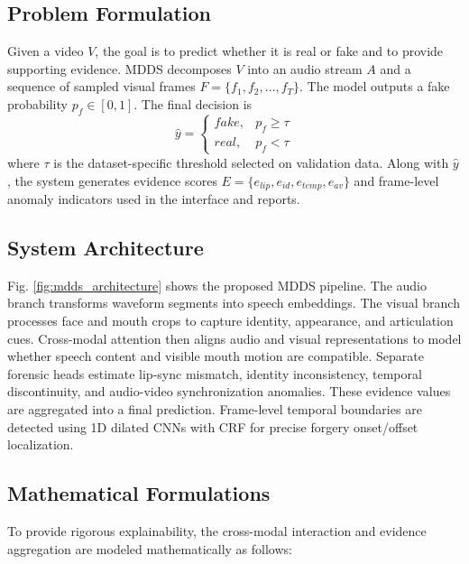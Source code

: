 \documentclass[conference]{IEEEtran}
\begin{document}
\subsection{Problem Formulation}
Given a video $V$, the goal is to predict whether it is real or fake and to provide supporting evidence. MDDS decomposes $V$ into an audio stream $A$ and a sequence of sampled visual frames $F=\{f_1,f_2,\ldots,f_T\}$. The model outputs a fake probability $p_f \in [0,1]$. The final decision is
\begin{equation}
\hat{y} =
\begin{cases}
fake, & p_f \geq \tau \\
real, & p_f < \tau
\end{cases}
\end{equation}
where $\tau$ is the dataset-specific threshold selected on validation data. Along with $\hat{y}$, the system generates evidence scores $E=\{e_{lip},e_{id},e_{temp},e_{av}\}$ and frame-level anomaly indicators used in the interface and reports.

\subsection{System Architecture}
Fig. \ref{fig:mdds_architecture} shows the proposed MDDS pipeline. The audio branch transforms waveform segments into speech embeddings. The visual branch processes face and mouth crops to capture identity, appearance, and articulation cues. Cross-modal attention then aligns audio and visual representations to model whether speech content and visible mouth motion are compatible. Separate forensic heads estimate lip-sync mismatch, identity inconsistency, temporal discontinuity, and audio-video synchronization anomalies. These evidence values are aggregated into a final prediction. Frame-level temporal boundaries are detected using 1D dilated CNNs with CRF for precise forgery onset/offset localization.

\subsection{Mathematical Formulations}
To provide rigorous explainability, the cross-modal interaction and evidence aggregation are modeled mathematically as follows:
\end{document}
